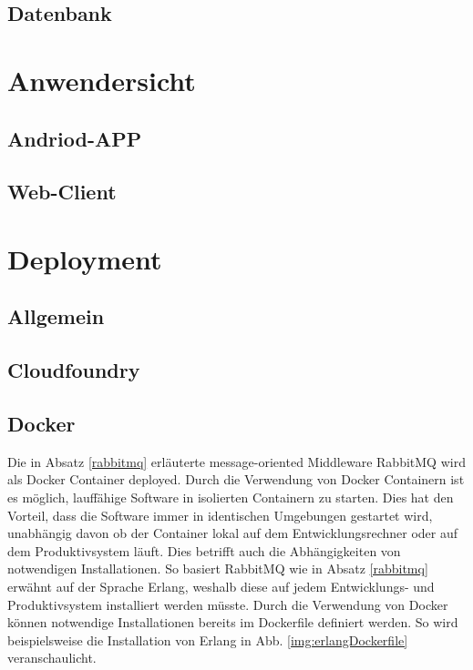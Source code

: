 \documentclass[paper,oneside,onecolumn,notitlepage,bibtotocnumbered,fontsize=12pt,bigheadings,ngerman]{scrartcl}
\begin{document}
\subsection{Datenbank}



\section{Anwendersicht}
\subsection{Andriod-APP}
\subsection{Web-Client}
\section{Deployment}
\subsection{Allgemein}
\subsection{Cloudfoundry}
\subsection{Docker}
Die in Absatz \ref{rabbitmq} erläuterte message-oriented Middleware RabbitMQ wird als Docker Container deployed. Durch die Verwendung von Docker Containern ist es möglich, lauffähige Software in isolierten Containern zu starten. Dies hat den Vorteil, dass die Software immer in identischen Umgebungen gestartet wird, unabhängig davon ob der Container lokal auf dem Entwicklungsrechner oder auf dem Produktivsystem läuft. Dies betrifft auch die Abhängigkeiten von notwendigen Installationen. So basiert RabbitMQ wie in Absatz \ref{rabbitmq} erwähnt auf der Sprache Erlang, weshalb diese auf jedem Entwicklungs- und Produktivsystem installiert werden müsste. Durch die Verwendung von Docker können notwendige Installationen bereits im Dockerfile definiert werden. So wird beispielsweise die Installation von Erlang in Abb. \ref{img:erlangDockerfile} veranschaulicht. 
\end{document}
